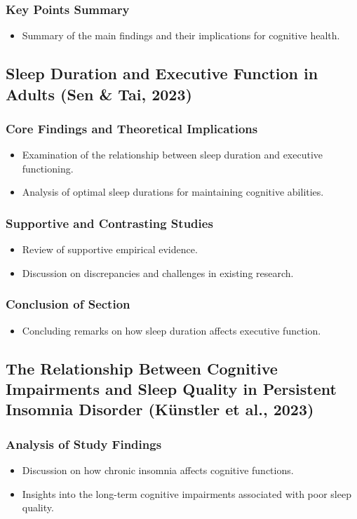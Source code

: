 \subsubsection{Key Points Summary}
\begin{itemize}
    \item Summary of the main findings and their implications for cognitive health.
\end{itemize}

\subsection{Sleep Duration and Executive Function in Adults (Sen \& Tai, 2023)}
\subsubsection{Core Findings and Theoretical Implications}
\begin{itemize}
    \item Examination of the relationship between sleep duration and executive functioning.
    \item Analysis of optimal sleep durations for maintaining cognitive abilities.
\end{itemize}
\subsubsection{Supportive and Contrasting Studies}
\begin{itemize}
    \item Review of supportive empirical evidence.
    \item Discussion on discrepancies and challenges in existing research.
\end{itemize}
\subsubsection{Conclusion of Section}
\begin{itemize}
    \item Concluding remarks on how sleep duration affects executive function.
\end{itemize}

\subsection{The Relationship Between Cognitive Impairments and Sleep Quality in Persistent Insomnia Disorder (Künstler et al., 2023)}
\subsubsection{Analysis of Study Findings}
\begin{itemize}
    \item Discussion on how chronic insomnia affects cognitive functions.
    \item Insights into the long-term cognitive impairments associated with poor sleep quality.
\end{itemize}

